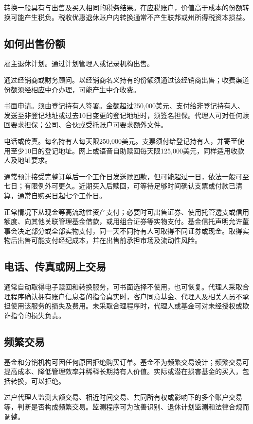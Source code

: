 \documentclass[UTF8,fontset=none,11pt,a4paper]{ctexart}
\begin{document}
转换一般具有与出售及买入相同的税务结果。在应税账户，价值高于成本的份额转换可能产生税负。税收优惠退休账户内转换通常不产生联邦或州所得税资本损益。


\subsection*{如何出售份额}
雇主退休计划。通过计划管理人或记录机构出售。


通过经销商或财务顾问。以经销商名义持有的份额须通过该经销商出售；收费渠道份额须经相应中介办理，可能产生中介收费。


书面申请。须由登记持有人签署。金额超过250,000美元、支付给非登记持有人、发送至非登记地址或过去10日变更的登记地址时，须签名担保。代理人可对任何赎回要求担保；公司、合伙或受托账户可要求额外文件。


电话或传真。每名持有人每天限250,000美元。支票须付给登记持有人，并寄至使用至少10日的登记地址。网上或语音自助赎回每天限125,000美元，同样适用收款人及地址要求。


通常预计接受完整订单后一个工作日发送赎回款，但可能超过一日，依法一般可至七日；有限例外可更久。近期买入后赎回，可等待足够时间确认支票或付款已清算，通常自购买日起七个工作日。


正常情况下从现金等高流动性资产支付；必要时可出售证券、使用托管透支或信用额度、向其他关联管理基金借款，或用组合证券等实物支付。基金信托声明允许董事会决定部分或全部实物支付，同一天不同持有人可取得不同证券或现金。取得实物后出售可能支付经纪成本，并在出售前承担市场及流动性风险。


\subsection*{电话、传真或网上交易}
通常自动取得电子赎回和转换服务，可书面选择不使用，也可恢复。代理人采取合理程序确认拥有账户信息者的指令真实时，客户同意基金、代理人及相关人员不承担使用该服务的损失及费用。未采取合理程序时，代理人或基金可对未经授权或欺诈指令的损失负责。


\subsection*{频繁交易}
基金和分销机构可因任何原因拒绝购买订单。基金不为频繁交易设计；频繁交易可提高成本、降低管理效率并稀释长期持有人价值。实际或潜在损害基金的买入，包括转换，可以拒绝。


过户代理人监测大额交易、相近时间交易、共同所有权或影响下的多个账户交易等，判断是否构成频繁交易。监测程序可为改善识别、退休计划监测和法律合规而调整。
\end{document}
